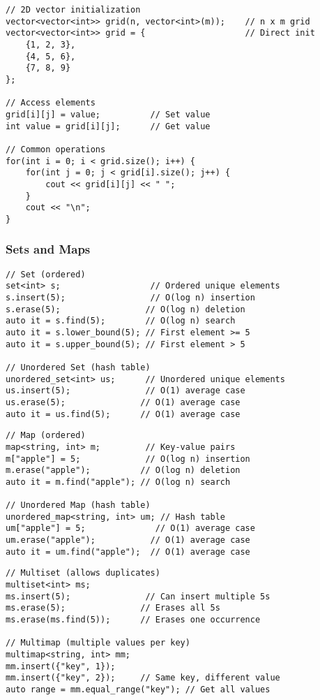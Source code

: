 \documentclass[11pt,a4paper]{article}
\begin{document}
\begin{lstlisting}[caption={2D Vector Operations}]
// 2D vector initialization
vector<vector<int>> grid(n, vector<int>(m));    // n x m grid
vector<vector<int>> grid = {                    // Direct init
    {1, 2, 3},
    {4, 5, 6},
    {7, 8, 9}
};

// Access elements
grid[i][j] = value;          // Set value
int value = grid[i][j];      // Get value

// Common operations
for(int i = 0; i < grid.size(); i++) {
    for(int j = 0; j < grid[i].size(); j++) {
        cout << grid[i][j] << " ";
    }
    cout << "\n";
}
\end{lstlisting}

\subsubsection{Sets and Maps}

\begin{lstlisting}[caption={Set and Unordered Set}]
// Set (ordered)
set<int> s;                  // Ordered unique elements
s.insert(5);                 // O(log n) insertion
s.erase(5);                 // O(log n) deletion
auto it = s.find(5);        // O(log n) search
auto it = s.lower_bound(5); // First element >= 5
auto it = s.upper_bound(5); // First element > 5

// Unordered Set (hash table)
unordered_set<int> us;      // Unordered unique elements
us.insert(5);               // O(1) average case
us.erase(5);               // O(1) average case
auto it = us.find(5);      // O(1) average case
\end{lstlisting}

\begin{lstlisting}[caption={Map and Unordered Map}]
// Map (ordered)
map<string, int> m;         // Key-value pairs
m["apple"] = 5;             // O(log n) insertion
m.erase("apple");          // O(log n) deletion
auto it = m.find("apple"); // O(log n) search

// Unordered Map (hash table)
unordered_map<string, int> um; // Hash table
um["apple"] = 5;              // O(1) average case
um.erase("apple");           // O(1) average case
auto it = um.find("apple");  // O(1) average case
\end{lstlisting}


\begin{lstlisting}[caption={Multiset and Multimap Operations}]
// Multiset (allows duplicates)
multiset<int> ms;
ms.insert(5);               // Can insert multiple 5s
ms.erase(5);               // Erases all 5s
ms.erase(ms.find(5));      // Erases one occurrence

// Multimap (multiple values per key)
multimap<string, int> mm;
mm.insert({"key", 1});
mm.insert({"key", 2});     // Same key, different value
auto range = mm.equal_range("key"); // Get all values
\end{lstlisting}
\end{document}
